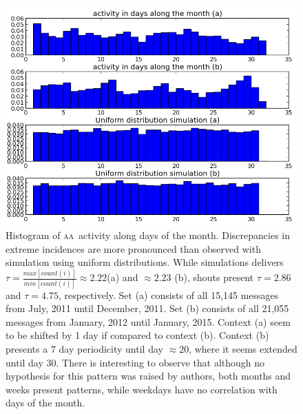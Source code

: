\documentclass[a4paper, 11pt]{article} %
\newcommand{\aab}{\textsc{aa}}
\begin{document}
\begin{figure}[H]
    \hspace{-25mm}
    \includegraphics[width=1.3\textwidth]{imgs/monthdayHist}
    \caption{\small Histogram of \aab\ activity along days of the month. Discrepancies in extreme incidences are more pronounced than observed with simulation using uniform distributions. While simulations delivers $\tau=\frac{max[count(i)]}{min[count(i)]}\approx2.22$(a) and $\approx 2.23$ (b), shouts present $\tau=2.86$ and $\tau=4.75$, respectively. Set (a) consists of all 15,145 messages from July, 2011 until December, 2011. Set (b) consists of all 21,055 messages from January, 2012 until January, 2015. Context (a) seem to be shifted by 1 day if compared to context (b). Context (b) presents a 7 day periodicity until day $\approx 20$, where it seems extended until day 30. There is interesting to observe that although no hypothesis for this pattern was raised by authors, both months and weeks present patterns, while weekdays have no correlation with days of the month.}\label{fig:histDay}
\end{figure}
\end{document}

